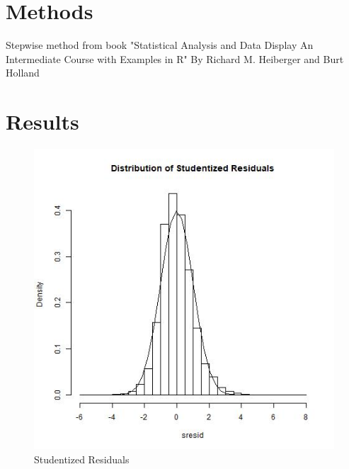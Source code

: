 \documentclass{article}
\begin{document}
\begin{table}[H]
    \centering
    \caption{Major Job Categories}
    \label{tab: job_categories}
\end{table}

\section{Methods}

Stepwise method from book "Statistical Analysis and Data Display An Intermediate Course with Examples in R" By Richard M. Heiberger and Burt Holland 



\section{Results}



\begin{figure}[H]
    \centering
    \includegraphics[width= .6\linewidth]{images/student_resid_plot.jpeg}
    \caption{Studentized Residuals}
    \label{fig: student_resid}
\end{figure}
\end{document}
